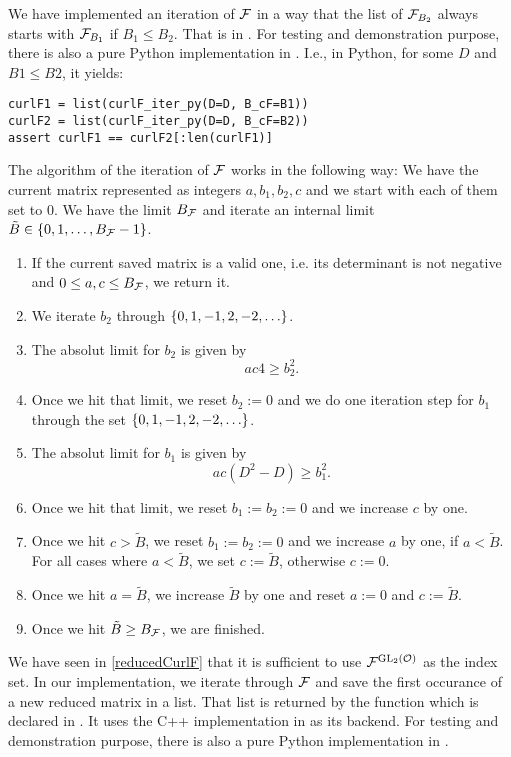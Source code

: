 We have implemented an iteration of $\mathcal{F}$ in a way that the list of $\mathcal{F}_{B_2}$ always starts with $\mathcal{F}_{B_1}$ if $B_1 \le B_2$. That is  in . For testing and demonstration purpose, there is also a pure Python implementation  in . I.e., in Python, for some $D$ and $B1 \le B2$, it yields:
\begin{lstlisting}
curlF1 = list(curlF_iter_py(D=D, B_cF=B1))
curlF2 = list(curlF_iter_py(D=D, B_cF=B2))
assert curlF1 == curlF2[:len(curlF1)]
\end{lstlisting}

The algorithm of the iteration of $\mathcal{F}$ works in the following way: We have the current matrix represented as integers $a,b_1,b_2,c$ and we start with each of them set to $0$. We have the limit $B_{\mathcal{F}}$ and iterate an internal limit $\tilde{B} \in \Set{0,1,\dots,B_\F-1}$.
\begin{enumerate}
\item If the current saved matrix is a valid one, i.e. its determinant is not negative and $0 \le a,c \le B_{\mathcal{F}}$, we return it.
\item We iterate $b_2$ through $\Set{0,1,-1,2,-2,\dots}$.
\item The absolut limit for $b_2$ is given by
\[ a c 4 \ge b_2^2 . \]
\item Once we hit that limit, we reset $b_2 := 0$ and we do one iteration step for $b_1$ through the set $\Set{0,1,-1,2,-2,\dots}$.
\item The absolut limit for $b_1$ is given by
\[ a c (D^2 - D) \ge b_1^2 . \]
\item Once we hit that limit, we reset $b_1 := b_2 := 0$ and we increase $c$ by one.
\item Once we hit $c > \tilde{B}$, we reset $b_1 := b_2 := 0$ and we increase $a$ by one, if $a < \tilde{B}$. For all cases where $a < \tilde{B}$, we set $c := \tilde{B}$, otherwise $c := 0$.
\item Once we hit $a = \tilde{B}$, we increase $\tilde{B}$ by one and reset $a := 0$ and $c := \tilde{B}$.
\item Once we hit $\tilde{B} \ge B_{\mathcal{F}}$, we are finished.
\end{enumerate}

We have seen in \cref{reducedCurlF} that it is sufficient to use ${\mathcal{F}}^{\operatorname{GL}_2(\mathcal{O})}$ as the index set. In our implementation, we iterate through $\mathcal{F}$ and save the first occurance of a new reduced matrix in a list. That list is returned by the function  which is declared in . It uses the C++ implementation in  as its backend. For testing and demonstration purpose, there is also a pure Python implementation  in .

